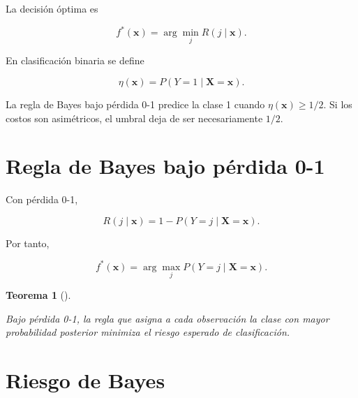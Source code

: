 \documentclass[
  spanish,
  10.5pt,
  letterpaper,
  DIV=11,
  numbers=noendperiod,
  oneside,
  open=any]{scrreprt}
\theoremstyle{definition}
\theoremstyle{definition}
\theoremstyle{plain}
\newtheorem{theorem}{Teorema}[chapter]
\theoremstyle{remark}
\begin{document}
La decisión óptima es

\[
f^{*}(\mathbf{x})
=
\arg\min_j
R(j\mid\mathbf{x}).
\]

\begin{tcolorbox}[enhanced jigsaw, arc=.35mm, bottomrule=.15mm, bottomtitle=1mm, breakable, colback=white, colbacktitle=quarto-callout-note-color!10!white, colframe=quarto-callout-note-color-frame, coltitle=black, left=2mm, leftrule=.75mm, opacityback=0, opacitybacktitle=0.6, rightrule=.15mm, title=\textcolor{quarto-callout-note-color}{\faInfo}\hspace{0.5em}{Probabilidades posteriores}, titlerule=0mm, toprule=.15mm, toptitle=1mm]

En clasificación binaria se define

\[
\eta(\mathbf{x})
=
P(Y=1\mid\mathbf{X}=\mathbf{x}).
\]

La regla de Bayes bajo pérdida 0-1 predice la clase 1 cuando
\(\eta(\mathbf{x})\geq 1/2\). Si los costos son asimétricos, el umbral
deja de ser necesariamente \(1/2\).

\end{tcolorbox}

\section*{Regla de Bayes bajo pérdida
0-1}\label{regla-de-bayes-bajo-puxe9rdida-0-1}


Con pérdida 0-1,

\[
R(j\mid\mathbf{x})
=
1-
P(Y=j\mid\mathbf{X}=\mathbf{x}).
\]

Por tanto,

\[
f^{*}(\mathbf{x})
=
\arg\max_j
P(Y=j\mid\mathbf{X}=\mathbf{x}).
\]

\begin{theorem}[]\protect\hypertarget{thm-regla-bayes}{}\label{thm-regla-bayes}

Bajo pérdida 0-1, la regla que asigna a cada observación la clase con
mayor probabilidad posterior minimiza el riesgo esperado de
clasificación.

\end{theorem}

\section*{Riesgo de Bayes}\label{riesgo-de-bayes-1}
\end{document}
